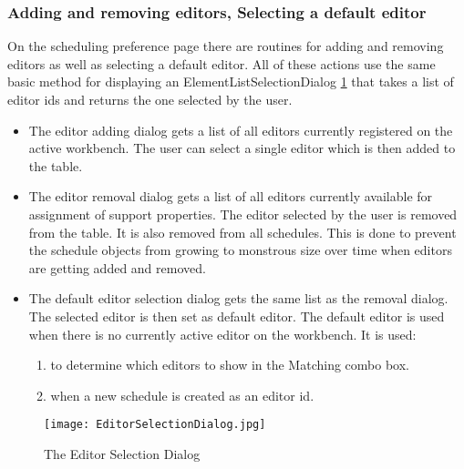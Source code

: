 \subsubsection{Adding and removing editors, Selecting a default editor}
On the scheduling preference page there are routines for adding and removing
editors as well as selecting a default editor.
All of these actions use the same basic method for displaying an ElementListSelectionDialog \ref{fig:EditorSelectionDialog}
that takes a list of editor ids and returns the one selected by the user.
\begin{itemize}
 \item The editor adding dialog gets a list of all editors currently registered on the
 active workbench. The user can select a single editor which is then added to the table.
 \item The editor removal dialog gets a list of all editors currently available for 
 assignment of support properties. The editor selected by the user is removed from the table.
 It is also removed from all schedules. This is done to prevent the schedule objects from growing
 to monstrous size over time when editors are getting added and removed.
 \item The default editor selection dialog gets the same list as the removal dialog. The selected
 editor is then set as default editor. The default editor is used when there is no currently active editor on the workbench.
  It is used:
  \begin{enumerate}
   \item to determine which editors to show in the Matching combo box.
   \item when a new schedule is created as an editor id.
  \end{enumerate}
\end{itemize}
\begin{figure}[EditorSelectionDialog]
  \centering
  \texttt{[image: EditorSelectionDialog.jpg]}
  \caption[Editor Selection Dialog]%
  {The Editor Selection Dialog\protect}
  \label{fig:EditorSelectionDialog}
\end{figure}